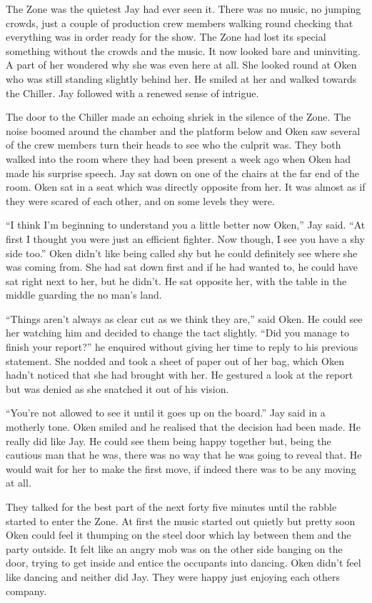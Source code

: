 The Zone was the quietest Jay had ever seen it.  There was no music, no jumping crowds, just a couple of production crew members walking round checking that everything was in order ready for the show.  The Zone had lost its special something without the crowds and the music.  It now looked bare and uninviting.  A part of her wondered why she was even here at all.  She looked round at Oken who was still standing slightly behind her.  He smiled at her and walked towards the Chiller.  Jay followed with a renewed sense of intrigue.  

The door to the Chiller made an echoing shriek in the silence of the Zone.  The noise boomed around the chamber and the platform below and Oken saw several of the crew members turn their heads to see who the culprit was.  They both walked into the room where they had been present a week ago when Oken had made his surprise speech.  Jay sat down on one of the chairs at the far end of the room.  Oken sat in a seat which was directly opposite from her.  It was almost as if they were scared of each other, and on some levels they were.

``I think I'm beginning to understand you a little better now Oken,'' Jay said.  ``At first I thought you were just an efficient fighter.  Now though, I see you have a shy side too.''  Oken didn't like being called shy but he could definitely see where she was coming from.  She had sat down first and if he had wanted to, he could have sat right next to her, but he didn't.  He sat opposite her, with the table in the middle guarding the no man's land.  

``Things aren't always as clear cut as we think they are,'' said Oken.  He could see her watching him and decided to change the tact slightly.  ``Did you manage to finish your report?'' he enquired without giving her time to reply to his previous statement.  She nodded and took a sheet of paper out of her bag, which Oken hadn't noticed that she had brought with her.  He gestured a look at the report but was denied as she snatched it out of his vision.  

``You're not allowed to see it until it goes up on the board.''  Jay said in a motherly tone.  Oken smiled and he realised that the decision had been made.  He really did like Jay.  He could see them being happy together but, being the cautious man that he was, there was no way that he was going to reveal that.  He would wait for her to make the first move, if indeed there was to be any moving at all.

They talked for the best part of the next forty five minutes until the rabble started to enter the Zone.  At first the music started out quietly but pretty soon Oken could feel it thumping on the steel door which lay between them and the party outside.  It felt like an angry mob was on the other side banging on the door, trying to get inside and entice the occupants into dancing.  Oken didn't feel like dancing and neither did Jay.  They were happy just enjoying each others company.  

